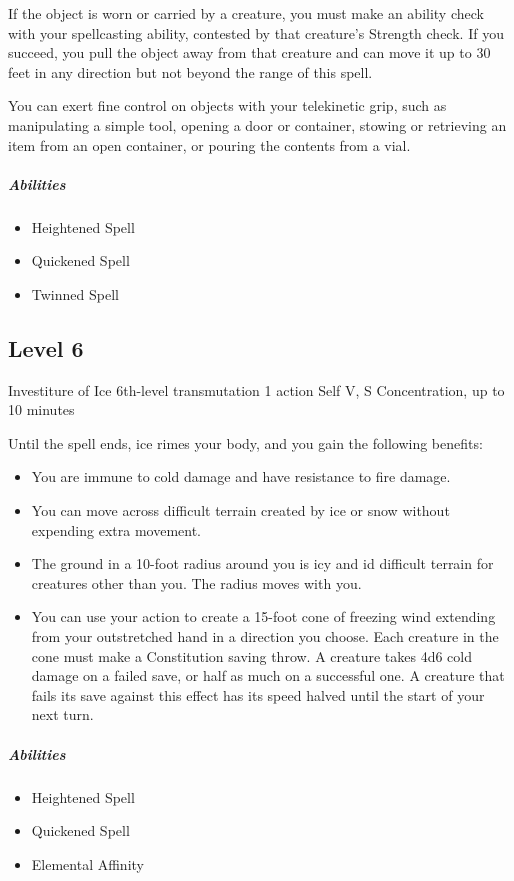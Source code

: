 \documentclass[letterpaper,openany,oneside,twocolumn]{book}
\begin{document}
If the object is worn or carried by a creature, you must make an ability check with your spellcasting ability, contested by that creature's Strength check. If you succeed, you pull the object away from that creature and can move it up to 30 feet in any direction but not beyond the range of this spell.

You can exert fine control on objects with your telekinetic grip, such as manipulating a simple tool, opening a door or container, stowing or retrieving an item from an open container, or pouring the contents from a vial.

\subparagraph*{Abilities}
\begin{itemize}
  \item Heightened Spell
  \item Quickened Spell
  \item Twinned Spell
\end{itemize}


\subsection*{Level 6}

\DndSpellHeader
  {Investiture of Ice}
  {6th-level transmutation}
  {1 action}
  {Self}
  {V, S}
  {Concentration, up to 10 minutes}

Until the spell ends, ice rimes your body, and you gain the following benefits:
\begin{itemize}
  \item You are immune to cold damage and have resistance to fire damage.
  \item You can move across difficult terrain created by ice or snow without expending extra movement.
  \item The ground in a 10-foot radius around you is icy and id difficult terrain for creatures other than you. The radius moves with you.
  \item You can use your action to create a 15-foot cone of freezing wind extending from your outstretched hand in a direction you choose. Each creature in the cone must make a Constitution saving throw. A creature takes 4d6 cold damage on a failed save, or half as much on a successful one. A creature that fails its save against this effect has its speed halved until the start of your next turn.
\end{itemize}

\subparagraph*{Abilities}
\begin{itemize}
  \item Heightened Spell
  \item Quickened Spell
  \item Elemental Affinity
\end{itemize}
\end{document}
